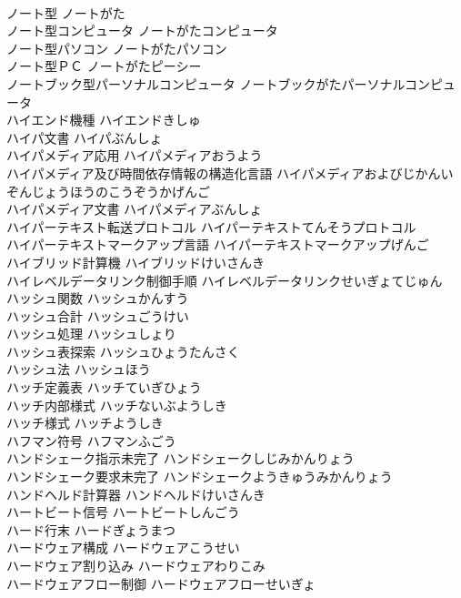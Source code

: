 \documentclass[8pt]{extreport}
\begin{document}
\begin{CJK}{UTF8}{min}
\\	ノート型	ノートがた	
\\	ノート型コンピュータ	ノートがたコンピュータ	
\\	ノート型パソコン	ノートがたパソコン	
\\	ノート型ＰＣ	ノートがたピーシー	
\\	ノートブック型パーソナルコンピュータ	ノートブックがたパーソナルコンピュータ	
\\	ハイエンド機種	ハイエンドきしゅ	
\\	ハイパ文書	ハイパぶんしょ	
\\	ハイパメディア応用	ハイパメディアおうよう	
\\	ハイパメディア及び時間依存情報の構造化言語	ハイパメディアおよびじかんいぞんじょうほうのこうぞうかげんご	
\\	ハイパメディア文書	ハイパメディアぶんしょ	
\\	ハイパーテキスト転送プロトコル	ハイパーテキストてんそうプロトコル	
\\	ハイパーテキストマークアップ言語	ハイパーテキストマークアップげんご	
\\	ハイブリッド計算機	ハイブリッドけいさんき	
\\	ハイレベルデータリンク制御手順	ハイレベルデータリンクせいぎょてじゅん	
\\	ハッシュ関数	ハッシュかんすう	
\\	ハッシュ合計	ハッシュごうけい	
\\	ハッシュ処理	ハッシュしょり	
\\	ハッシュ表探索	ハッシュひょうたんさく	
\\	ハッシュ法	ハッシュほう	
\\	ハッチ定義表	ハッチていぎひょう	
\\	ハッチ内部様式	ハッチないぶようしき	
\\	ハッチ様式	ハッチようしき	
\\	ハフマン符号	ハフマンふごう	
\\	ハンドシェーク指示未完了	ハンドシェークしじみかんりょう	
\\	ハンドシェーク要求未完了	ハンドシェークようきゅうみかんりょう	
\\	ハンドヘルド計算器	ハンドヘルドけいさんき	
\\	ハートビート信号	ハートビートしんごう	
\\	ハード行末	ハードぎょうまつ	
\\	ハードウェア構成	ハードウェアこうせい	
\\	ハードウェア割り込み	ハードウェアわりこみ	
\\	ハードウェアフロー制御	ハードウェアフローせいぎょ	

\end{CJK}
\end{document}
